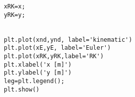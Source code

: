 \begin{small}
\begin{verbatim}
	xRK=x;
	yRK=y;
	
	
	plt.plot(xnd,ynd, label='kinematic')
	plt.plot(xE,yE, label='Euler')
	plt.plot(xRK,yRK,label='RK')
	plt.xlabel('x [m]')
	plt.ylabel('y [m]')
	leg=plt.legend();
	plt.show()
	
	\end{verbatim}
	
\end{small}


